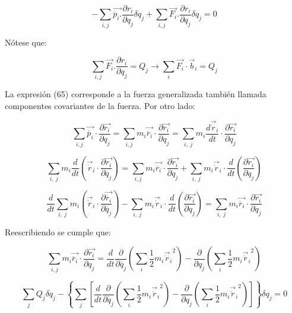 \documentclass[]{article}
\begin{document}
\[- \sum_{i,j}^{}{\overrightarrow{\dot{p_{i}}.}\frac{\partial r_{i}}{\partial q_{j}}}\delta q_{j} + \sum_{i,j}^{}{\overrightarrow{F_{i}}.\frac{\partial r_{i}}{\partial q_{j}}\delta q_{j}} = 0\]

Nótese que:

\[\sum_{i,j}^{}{\overrightarrow{F_{i}}.\frac{\partial r_{i}}{\partial q_{j}} = Q_{j} \rightarrow \sum_{i}^{}{\overrightarrow{F_{i}} \cdot {\overrightarrow{b}}_{i} = Q_{j}}}\]

La expresión (65) corresponde a la fuerza generalizada también llamada
componentes covariantes de la fuerza. Por otro lado:

\[\sum_{i,j}^{}{\overrightarrow{\dot{p_{i}}} \cdot \frac{\partial\overrightarrow{r_{i}}}{\partial q_{j}}} = \sum_{i,j}^{}{m_{i}\overrightarrow{\ddot{r_{i}}} \cdot \frac{\partial\overrightarrow{r_{i}}}{\partial q_{j}}} = \sum_{i,\ j}^{}{m_{i}\frac{d{\overrightarrow{\dot{r}}}_{i}}{dt} \cdot \frac{\partial\overrightarrow{r_{i}}}{\partial q_{j}}}\]

\[\sum_{i,\ j}^{}{m_{i}\frac{d}{dt}\left( {\overrightarrow{\dot{r}}}_{i} \cdot \frac{\partial\overrightarrow{r_{i}}}{\partial q_{j}} \right) =}\sum_{i,j}^{}{m_{i}\overrightarrow{\ddot{r_{i}}} \cdot \frac{\partial\overrightarrow{r_{i}}}{\partial q_{j}}} + \sum_{i,\ j}^{}m_{i}{\overrightarrow{\dot{r}}}_{i} \cdot \frac{d}{dt}\left( \frac{\partial\overrightarrow{r_{i}}}{\partial q_{j}} \right)\]

\[\frac{d}{dt}\sum_{i,\ j}^{}m_{i}\left( {\overrightarrow{\dot{r}}}_{i} \cdot \frac{\partial\overrightarrow{\dot{r_{i}}}}{\partial\dot{q_{j}}} \right) - \sum_{i,\ j}^{}m_{i}{\overrightarrow{\dot{r}}}_{i} \cdot \frac{d}{dt}\left( \frac{\partial\overrightarrow{r_{i}}}{\partial q_{j}} \right) = \sum_{i,\ j}^{}{m_{i}\overrightarrow{\ddot{r_{i}}}} \cdot \frac{\partial\overrightarrow{r_{i}}}{\partial q_{j}}\]

Reescribiendo se cumple que:

\[\sum_{i,j}^{}{m_{i}\overrightarrow{\ddot{r_{i}}} \cdot \frac{\partial\overrightarrow{r_{i}}}{\partial q_{j}}} = \frac{d}{dt}\frac{\partial}{\partial\dot{q_{j}}}\left( \sum_{i}^{}{\frac{1}{2}m_{i}}{{\overrightarrow{\dot{r}}}_{i}}^{2} \right) - \frac{\partial}{\partial q_{j}}\left( \sum_{i}^{}{\frac{1}{2}m_{i}}{{\overrightarrow{\dot{r}}}_{i}}^{2} \right)\]

\[\sum_{j}^{}Q_{j}\delta q_{j} - \left\{ \sum_{j}^{}\left\lbrack \frac{d}{dt}\frac{\partial}{\partial\dot{q_{j}}}\left( \sum_{i}^{}{\frac{1}{2}m_{i}}{{\overrightarrow{\dot{r}}}_{i}}^{2} \right) - \frac{\partial}{\partial q_{j}}\left( \sum_{i}^{}{\frac{1}{2}m_{i}}{{\overrightarrow{\dot{r}}}_{i}}^{2} \right) \right\rbrack \right\}\delta q_{j} = 0\]
\end{document}
